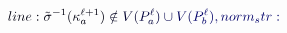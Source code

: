 \documentclass[12pt]{article}
\begin{document}
\makeatletter
\renewcommand*{\@textcolor}[3]{%
  \protect\leavevmode
  \begingroup
    \color#1{#2}#3%
  \endgroup
}
\makeatother
\begin{displaymath}
\mathcolor[RGB]{0,0,15}{line:
\Tilde{\sigma}^{-1}(\kappa_a^{\ell+1})} \mathcolor[RGB]{0,0,30}{\notin} \mathcolor[RGB]{0,0,45}{V(\mathcal} \mathcolor[RGB]{0,0,60}{P_a^\ell)} \mathcolor[RGB]{0,0,75}{\cup} \mathcolor[RGB]{0,0,90}{V(\mathcal} \mathcolor[RGB]{0,0,105}{P_b^\ell),

norm_str:}
\end{displaymath}
\end{document}
